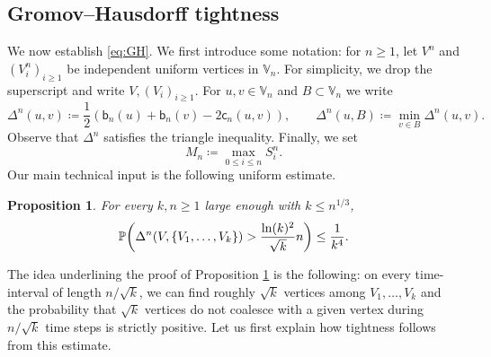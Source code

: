 \documentclass[11pt]{article}
\theoremstyle{plain}
\newtheorem{proposition}[theorem]{Proposition}
\theoremstyle{definition}
\theoremstyle{remark}
\newcommand{\1}{\mathbbm{1}} %
\newcommand{\proba}[1]{\mathbb{P}\left(#1\right)} %
\newcommand{\birth}{\mathsf{b}} %
\newcommand{\coal}{\mathsf{c}} %
\newcommand{\V}{\mathbb{V}} %
\let\originalleft\left
\let\originalright\right
\renewcommand{\left}{\mathopen{}\mathclose\bgroup\originalleft}
\renewcommand{\right}{\aftergroup\egroup\originalright}
\begin{document}
\subsection{Gromov--Hausdorff tightness}
\label{ssec:tight}

We now establish \eqref{eq:GH}. We first  introduce some notation: for $n \geq 1$, let $V^n$ and $(V_i^n)_{ i \geq 1	}$ be independent uniform vertices in $\V_{n}$. For simplicity, we drop the superscript and write $V, (V_{i})_{i \geq 1}$. For $u,v\in \V_{n}$ and $B \subset \V_{n}$ we write
\[
\Delta^{n}(u,v) \coloneqq \frac{1}{2}(\birth_n(u)+\birth_n(v)-2 \coal_n(u,v)), \qquad \Delta^n(u,B) \coloneqq \min_{v\in B} \Delta^{n}(u,v).
\]
{Observe that $\Delta^{n}$ satisfies the triangle inequality.}
Finally, we set
\[M_{n}\coloneqq\max_{0\leq i \leq n} S^n_i.\]
Our main technical input is the following uniform estimate.


\begin{proposition}
\label{tightness time estimate}
For every $k,n \geq 1$ large enough with $k\leq n^{1/3}$,
\[ \proba{\Delta^n(V,\{V_1,\dots, V_{k}\}) > \frac{\ln(k)^2}{\sqrt{k}} n } \leq  \frac{1}{k^{4}}.\]
\end{proposition}

The idea underlining the proof of Proposition \ref{tightness time estimate} is the following: on every time-interval of length $n/\sqrt{k}$, we can find roughly $ \sqrt{k}$ vertices among $V_{1}, \ldots, V_{k}$ and the probability that $\sqrt{k}$ vertices do not coalesce with a given vertex during $n/\sqrt{k}$ time steps is  strictly positive. Let us first explain how tightness follows from this estimate.
\end{document}
